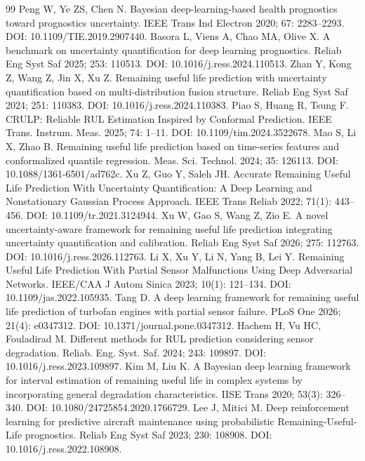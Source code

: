 \documentclass[11pt,a4paper]{article}
\begin{document}
\begin{thebibliography}{99}
\small
\setlength{\itemsep}{0pt}
 Peng W, Ye ZS, Chen N. Bayesian deep-learning-based health prognostics toward prognostics uncertainty. IEEE Trans Ind Electron 2020; 67: 2283–2293. DOI: 10.1109/TIE.2019.2907440.
 Basora L, Viens A, Chao MA, Olive X. A benchmark on uncertainty quantification for deep learning prognostics. Reliab Eng Syst Saf 2025; 253: 110513. DOI: 10.1016/j.ress.2024.110513.
 Zhan Y, Kong Z, Wang Z, Jin X, Xu Z. Remaining useful life prediction with uncertainty quantification based on multi-distribution fusion structure. Reliab Eng Syst Saf 2024; 251: 110383. DOI: 10.1016/j.ress.2024.110383.
 Piao S, Huang R, Tsung F. CRULP: Reliable RUL Estimation Inspired by Conformal Prediction. IEEE Trans. Instrum. Meas. 2025; 74: 1–11. DOI: 10.1109/tim.2024.3522678.
 Mao S, Li X, Zhao B. Remaining useful life prediction based on time-series features and conformalized quantile regression. Meas. Sci. Technol. 2024; 35: 126113. DOI: 10.1088/1361-6501/ad762c.
 Xu Z, Guo Y, Saleh JH. Accurate Remaining Useful Life Prediction With Uncertainty Quantification: A Deep Learning and Nonstationary Gaussian Process Approach. IEEE Trans Reliab 2022; 71(1): 443–456. DOI: 10.1109/tr.2021.3124944.
 Xu W, Gao S, Wang Z, Zio E. A novel uncertainty-aware framework for remaining useful life prediction integrating uncertainty quantification and calibration. Reliab Eng Syst Saf 2026; 275: 112763. DOI: 10.1016/j.ress.2026.112763.
 Li X, Xu Y, Li N, Yang B, Lei Y. Remaining Useful Life Prediction With Partial Sensor Malfunctions Using Deep Adversarial Networks. IEEE/CAA J Autom Sinica 2023; 10(1): 121–134. DOI: 10.1109/jas.2022.105935.
 Tang D. A deep learning framework for remaining useful life prediction of turbofan engines with partial sensor failure. PLoS One 2026; 21(4): e0347312. DOI: 10.1371/journal.pone.0347312.
 Hachem H, Vu HC, Fouladirad M. Different methods for RUL prediction considering sensor degradation. Reliab. Eng. Syst. Saf. 2024; 243: 109897. DOI: 10.1016/j.ress.2023.109897.
 Kim M, Liu K. A Bayesian deep learning framework for interval estimation of remaining useful life in complex systems by incorporating general degradation characteristics. IISE Trans 2020; 53(3): 326–340. DOI: 10.1080/24725854.2020.1766729.
 Lee J, Mitici M. Deep reinforcement learning for predictive aircraft maintenance using probabilistic Remaining-Useful-Life prognostics. Reliab Eng Syst Saf 2023; 230: 108908. DOI: 10.1016/j.ress.2022.108908.

\end{thebibliography}
\end{document}
